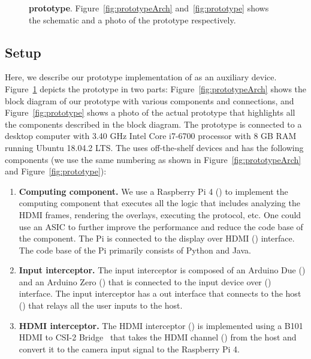 \begin{figure}[!htpb]
    \caption[\name prototype]{\textbf{\name prototype}. Figure~\ref{fig:prototypeArch} and~\ref{fig:prototype} shows the schematic and a photo of the  \name prototype respectively.} 
    \label{fig:prototypeAll}
\end{figure}

\subsection{Setup} Here, we describe our prototype implementation of \name as an auxiliary device. Figure~\ref{fig:prototypeAll} depicts the \name prototype in two parts: Figure~\ref{fig:prototypeArch} shows the block diagram of our prototype with various components and connections, and Figure~\ref{fig:prototype} shows a photo of the actual prototype that highlights all the components described in the block diagram. The prototype \device is connected to a desktop computer with 3.40 GHz Intel Core i7-6700 processor with 8 GB RAM running Ubuntu 18.04.2 LTS. The \device uses off-the-shelf devices and has the following components (we use the same numbering as shown in Figure~\ref{fig:prototypeArch} and  Figure~\ref{fig:prototype}):

\begin{enumerate}
 
  \item \textbf{Computing component.} We use a Raspberry Pi 4 (\six) to implement the computing component that executes all the \device logic that includes analyzing the HDMI frames, rendering the overlays, executing the \tls protocol, etc. One could use an ASIC to further improve the performance and reduce the code base of the component. The Pi is connected to the display over HDMI (\nine) interface. The code base of the Pi primarily consists of Python and Java.
  
  \item \textbf{Input interceptor.} The input interceptor is composed of an Arduino Due (\three) and an Arduino Zero (\four) that is connected to the input device over \usb (\two) interface. The input interceptor has a \usb out interface that connects to the host (\five) that relays all the user inputs to the host. 

  \item \textbf{HDMI interceptor.} The HDMI interceptor (\seven) is implemented using a B101 HDMI to CSI-2 Bridge~\cite{b101} that takes the HDMI channel (\eight) from the host and convert it to the camera input signal to the Raspberry Pi 4.  
 
\end{enumerate}

